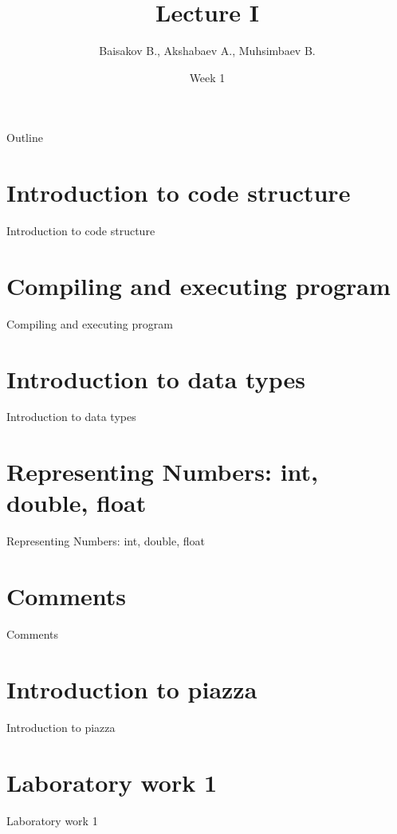 \documentclass{beamer}
\title[Programming Principles I]{Lecture I}
\author{Baisakov B., Akshabaev A., Muhsimbaev B.}
\institute{Kazakh-British Technical University}
\date{Week 1}
\begin{document}
    \begin{frame}
      \titlepage
    \end{frame}
    
    \begin{frame}{Outline}
      \tableofcontents
    \end{frame}
    
    \section{Introduction to code structure}
    \begin{frame}{Introduction to code structure}
        
    \end{frame}

    \section{Compiling and executing program}
    \begin{frame}{Compiling and executing program}
    \end{frame}

    \section{Introduction to data types}
    \begin{frame}{Introduction to data types}
     
    \end{frame}

    \section{Representing Numbers: int, double, float}
    \begin{frame}{Representing Numbers: int, double, float}
    \end{frame}

    \section{Comments}
    \begin{frame}{Comments}
    \end{frame}
    
    \section{Introduction to piazza}
    \begin{frame}{Introduction to piazza}
    \end{frame}

    \section{Laboratory work 1}
    \begin{frame}{Laboratory work 1}
    \end{frame}
    
    
\end{document}
